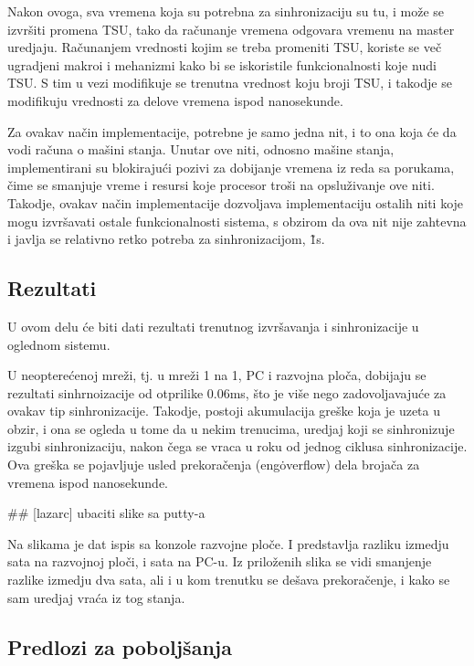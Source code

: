 \documentclass[a4paper,12pt, master]{etf}
\begin{document}
	Nakon ovoga, sva vremena koja su potrebna za sinhronizaciju su tu, i
	mo\v{z}e se izvr\v{s}iti promena TSU, tako da ra\v{c}unanje vremena
	odgovara vremenu na master uredjaju. Ra\v{c}unanjem vrednosti kojim se
	treba promeniti TSU, koriste se ve\v{c} ugradjeni makroi i mehanizmi kako
	bi se iskoristile funkcionalnosti koje nudi TSU\@. S tim u vezi modifikuje
	se trenutna vrednost koju broji TSU, i takodje se modifikuju vrednosti za
	delove vremena ispod nanosekunde.

	Za ovakav na\v{c}in implementacije, potrebne je samo jedna nit, i to ona
	koja \'{c}e da vodi ra\v{c}una o ma\v{s}ini stanja. Unutar ove niti,
	odnosno ma\v{s}ine stanja, implementirani su blokiraju\'{c}i pozivi za
	dobijanje vremena iz reda sa porukama, \v{c}ime se smanjuje vreme i resursi
	koje procesor tro\v{s}i na opslu\v{z}ivanje ove niti. Takodje, ovakav
	na\v{c}in implementacije dozvoljava implementaciju ostalih niti koje mogu
	izvr\v{s}avati ostale funkcionalnosti sistema, s obzirom da ova nit nije
	zahtevna i javlja se relativno retko potreba za sinhronizacijom, \~ 1s.

	\subsection{Rezultati}

	U ovom delu \'{c}e biti dati rezultati trenutnog izvr\v{s}avanja i
	sinhronizacije u oglednom sistemu.

	U neoptere\'{c}enoj mre\v{z}i, tj\@. u mre\v{z}i 1 na 1, PC i razvojna
	plo\v{c}a, dobijaju se rezultati sinhrnoizacije od otprilike 0.06ms,
	\v{s}to je vi\v{s}e nego zadovoljavaju\'{c}e za ovakav tip sinhronizacije.
	Takodje, postoji akumulacija gre\v{s}ke koja je uzeta u obzir, i ona se
	ogleda u tome da u nekim trenucima, uredjaj koji se	sinhronizuje izgubi
	sinhronizaciju, nakon \v{c}ega se vraca u roku od jednog ciklusa
	sinhronizacije. Ova gre\v{s}ka se pojavljuje usled prekora\v{c}enja
	(eng\. overflow) dela broja\v{c}a za vremena ispod nanosekunde.

	\#\# [lazarc] ubaciti slike sa putty-a

	Na slikama je dat ispis sa konzole razvojne plo\v{c}e. I predstavlja
	razliku izmedju sata na razvojnoj plo\v{c}i, i sata na PC-u. Iz
	prilo\v{z}enih slika se vidi smanjenje razlike izmedju dva sata, ali i u
	kom trenutku se de\v{s}ava prekora\v{c}enje, i kako se sam uredjaj
	vra\'{c}a iz tog stanja.

	\subsection{Predlozi za pobolj\v{s}anja}
\end{document}
